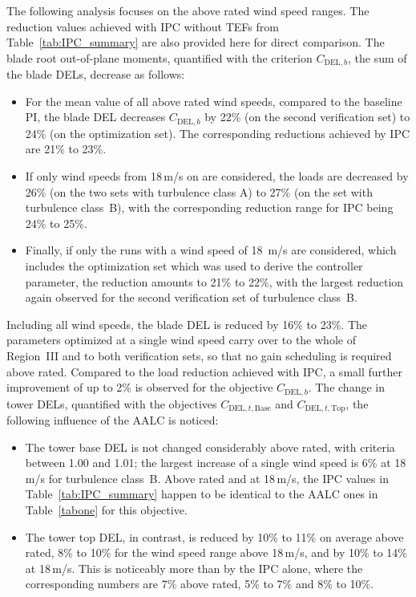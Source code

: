 The following analysis focuses on the above rated wind speed ranges. The reduction values achieved with IPC without TEFs from Table~\ref{tab:IPC_summary} are also provided here for direct comparison. The blade root out-of-plane moments, quantified with the criterion $C_{\text{DEL},b}$, the sum of the blade DELs, decrease as follows:
\begin{itemize}
    \item For the mean value of all above rated wind speeds, compared to the baseline PI, the blade DEL decreases $C_{\text{DEL},b}$ by 22\% (on the second verification set) to 24\% (on the optimization set). The corresponding reductions achieved by IPC are 21\% to 23\%. 
    \item If only wind speeds from 18\,m/s on are considered, the loads are decreased by 26\% (on the two sets with turbulence class A) to 27\% (on the set with turbulence class~B), with the corresponding reduction range for IPC being 24\% to 25\%.
    \item Finally, if only the runs with a wind speed of 18~m/s are considered, which includes the optimization set which was used to derive the controller parameter, the reduction amounts to 21\% to 22\%, with the largest reduction again observed for the second verification set of turbulence class~B. 
\end{itemize} 
Including all wind speeds, the blade DEL is reduced by 16\% to 23\%. The parameters optimized at a single wind speed carry over to the whole of Region~III and to both verification sets, so that no gain scheduling is required above rated. Compared to the load reduction achieved with IPC, a small further improvement of up to 2\% is observed for the objective $C_{\text{DEL},b}$.
%
The change in tower DELs, quantified with the objectives $C_{\text{DEL},t,\text{Base}}$ and $C_{\text{DEL},t,\text{Top}}$, the following influence of the AALC is noticed:
\begin{itemize}
    \item The tower base DEL is not changed considerably above rated, with criteria between 1.00 and 1.01; the largest increase of a single wind speed is 6\% at 18\,m/s for turbulence class~B. Above rated and at 18\,m/s, the IPC values in Table~\ref{tab:IPC_summary} happen to be identical to the AALC ones in Table~\ref{tabone} for this objective.
    \item The tower top DEL, in contrast, is reduced by 10\% to 11\% on average above rated, 8\% to 10\% for the wind speed range above 18\,m/s, and by 10\% to 14\% at 18\,m/s. This is noticeably more than by the IPC alone, where the corresponding numbers are 7\% above rated, 5\% to 7\% and 8\% to 10\%. 
\end{itemize}
